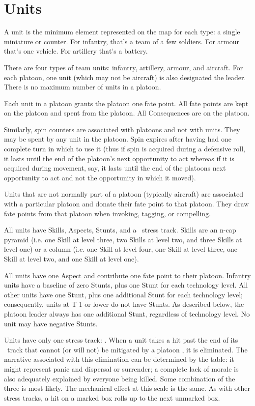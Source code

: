 \section{Units}\label{sec:Units}
\iflandscape{\vfil}{}


A unit is the minimum element represented on the map for each type: a single miniature or counter. For infantry, that's a team of a few soldiers. For armour that's one vehicle. For artillery that's a battery.

There are four types of team units: infantry, artillery, armour, and aircraft. For each platoon, one unit (which may not be aircraft) is also designated the leader. There is no maximum number of units in a platoon.

Each unit in a platoon grants the platoon one fate point. All fate points are kept on the platoon and spent from the platoon. All Consequences are on the platoon.

Similarly, spin counters are associated with platoons and not with units. They may be spent by any unit in the platoon. Spin expires after having had one complete turn in which to use it (thus if spin is acquired during a defensive roll, it lasts until the end of the platoon's next opportunity to act whereas if it is acquired during movement, say, it lasts until the end of the platoons next opportunity to act and not the opportunity in which it moved).

Units that are not normally part of a platoon (typically aircraft) are associated with a particular platoon and donate their fate point to that platoon. They draw fate points from that platoon when invoking, tagging, or compelling.

All units have Skills, Aspects, Stunts, and a \Morale\ stress track. Skills are an n-cap pyramid (i.e. one Skill at level three, two Skills at level two, and three Skills at level one) or a column (i.e. one Skill at level four, one Skill at level three, one Skill at level two, and one Skill at level one).

All units have one Aspect and contribute one fate point to their platoon. Infantry units have a baseline of zero Stunts, plus one Stunt for each technology level. All other units have one Stunt, plus one additional Stunt for each technology level; consequently, units at T-1 or lower do not have Stunts. As described below, the platoon leader always has one additional Stunt, regardless of technology level. No unit may have negative Stunts.

Units have only one stress track: \Morale. When a unit takes a hit past the end of its \Morale\ track that cannot (or will not) be mitigated by a platoon \Consequence, it is eliminated. The narrative associated with this elimination can be determined by the table: it might represent panic and dispersal or surrender; a complete lack of morale is also adequately explained by everyone being killed. Some combination of the three is most likely.  The mechanical effect at this scale is the same. As with other stress tracks, a hit on a marked box rolls up to the next unmarked box.

